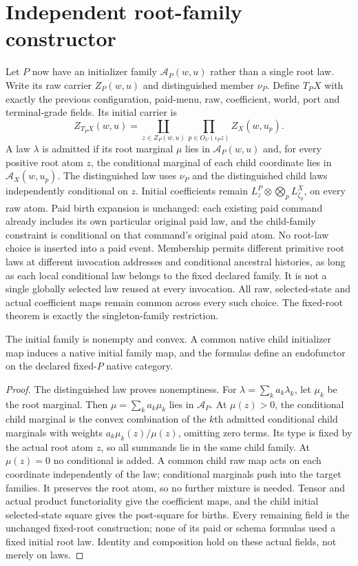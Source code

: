 \documentclass[11pt]{article}
\begin{document}
\section{Independent root-family constructor}
Let $P$ now have an initializer family $\mathcal A_P(w,u)$ rather than a single root law. Write its raw carrier $Z_P(w,u)$ and distinguished member $\nu_P$. Define $T_PX$ with exactly the previous configuration, paid-menu, raw, coefficient, world, port and terminal-grade fields. Its initial carrier is
\[
 Z_{T_PX}(w,u)=\coprod_{z\in Z_P(w,u)}\prod_{p\in O_U(\iota_Pz)}Z_X(w,u_p).
\]
A law $\lambda$ is admitted if its root marginal $\mu$ lies in $\mathcal A_P(w,u)$ and, for every positive root atom $z$, the conditional marginal of each child coordinate lies in $\mathcal A_X(w,u_p)$. The distinguished law uses $\nu_P$ and the distinguished child laws independently conditional on $z$. Initial coefficients remain $L^P_z\otimes\bigotimes_pL^X_{\zeta_p}$, on every raw atom. Paid birth expansion is unchanged: each existing paid command already includes its own particular original paid law, and the child-family constraint is conditional on that command's original paid atom. No root-law choice is inserted into a paid event. Membership permits different primitive root laws at different invocation addresses and conditional ancestral histories, as long as each local conditional law belongs to the fixed declared family. It is not a single globally selected law reused at every invocation. All raw, selected-state and actual coefficient maps remain common across every such choice. The fixed-root theorem is exactly the singleton-family restriction.

\begin{lemma}
The initial family is nonempty and convex. A common native child initializer map induces a native initial family map, and the formulas define an endofunctor on the declared fixed-$P$ native category.
\end{lemma}
\begin{proof}
The distinguished law proves nonemptiness. For $\lambda=\sum_k a_k\lambda_k$, let $\mu_k$ be the root marginal. Then $\mu=\sum_k a_k\mu_k$ lies in $\mathcal A_P$. At $\mu(z)>0$, the conditional child marginal is the convex combination of the $k$th admitted conditional child marginals with weights $a_k\mu_k(z)/\mu(z)$, omitting zero terms. Its type is fixed by the actual root atom $z$, so all summands lie in the same child family. At $\mu(z)=0$ no conditional is added. A common child raw map acts on each coordinate independently of the law; conditional marginals push into the target families. It preserves the root atom, so no further mixture is needed. Tensor and actual product functoriality give the coefficient maps, and the child initial selected-state square gives the post-square for births. Every remaining field is the unchanged fixed-root construction; none of its paid or schema formulas used a fixed initial root law. Identity and composition hold on these actual fields, not merely on laws.
\end{proof}
\end{document}

